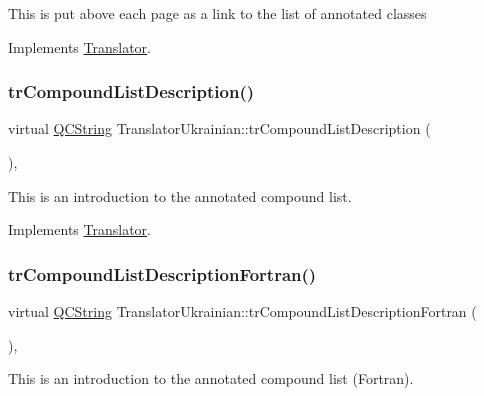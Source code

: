 This is put above each page as a link to the list of annotated classes 

Implements \mbox{\hyperlink{class_translator}{Translator}}.

\mbox{\label{class_translator_ukrainian_a810975f0d5699b4362480187b9d132b5}} 
\subsubsection{\texorpdfstring{trCompoundListDescription()}{trCompoundListDescription()}}
{\footnotesize\ttfamily virtual \mbox{\hyperlink{class_q_c_string}{Q\+C\+String}} Translator\+Ukrainian\+::tr\+Compound\+List\+Description (\begin{DoxyParamCaption}{ }\end{DoxyParamCaption})\hspace{0.3cm}{\ttfamily [inline]}, {\ttfamily [virtual]}}

This is an introduction to the annotated compound list. 

Implements \mbox{\hyperlink{class_translator}{Translator}}.

\mbox{\label{class_translator_ukrainian_a28d1b0521c13b8e8e58d5acb40ba8af8}} 
\subsubsection{\texorpdfstring{trCompoundListDescriptionFortran()}{trCompoundListDescriptionFortran()}}
{\footnotesize\ttfamily virtual \mbox{\hyperlink{class_q_c_string}{Q\+C\+String}} Translator\+Ukrainian\+::tr\+Compound\+List\+Description\+Fortran (\begin{DoxyParamCaption}{ }\end{DoxyParamCaption})\hspace{0.3cm}{\ttfamily [inline]}, {\ttfamily [virtual]}}

This is an introduction to the annotated compound list (Fortran). 

